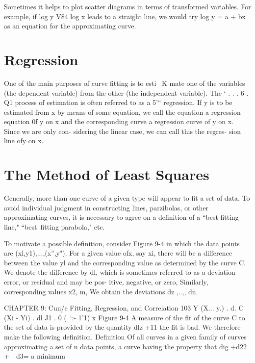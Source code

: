 Sometimes it helps to plot scatter diagrams in terms of transformed
variables. For example, if log y V84 log x leads to a straight line, we
would try log y = a + bx as an equation for the approximating curve.
\section{Regression}
One of the main purposes of curve ﬁtting is to esti~ K
mate one of the variables (the dependent variable) from the other (the independent variable). The ‘
. . . 6 . Q1
process of estimation is often referred to as a 5'“
regression. If y is to be estimated from x by means
of some equation, we call the equation a regression
equation 0f y on x and the corresponding curve a
regression curve of y on x. Since we are only con-
sidering the linear case, we can call this the regres-
sion line ofy on x.

\section{The Method of Least Squares}
Generally, more than one curve of a given type will appear to ﬁt a set of
data. To avoid individual judgment in constructing lines, parzibolas, or
other approximating curves, it is necessary to agree on a deﬁnition of a
“best-ﬁtting line," “best~ﬁtting parabola," etc.

To motivate a possible deﬁnition, consider Figure 9-4 in which the
data points are (xl,y1),...,(x”,y"). For a given value ofx, say xi, there will
be a difference between the value yl and the corresponding value as
determined by the curve C. We denote the difference by dl, which is
sometimes referred to as a deviation error, or residual and may be pos-
itive, negative, or zero, Similarly, corresponding values x2,  m, We
obtain the deviations dz ,..,, dn.



CHAPTER 9: Cun/e Fitting, Regression, and Correlation 103
Y
(X... y.)
. d. C
(Xi - Yi) .
dl J1 . 0
(~‘:- 1'1)
x
Figure 9-4
A measure of the ﬁt of the curve C to the set of data is provided by
the quantity dlz +11%
the ﬁt is bad. We therefore make the following deﬁnition.
Deﬁnition Of all curves in a given family of curves approximating a set of n data points, a curve having the property
that
dig +d22 +~~d3= a minimum

